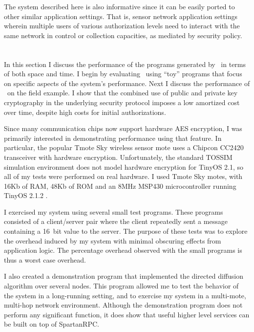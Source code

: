 The system described here is also informative since it can be easily ported to other similar
application settings. That is, sensor network application settings wherein multiple users of
various authorization levels need to interact with the same network in control or collection
capacities, as mediated by security policy.

\section{\Sprocket}
\label{section-sprocket-evaluation}

In this section I discuss the performance of the programs generated by \Sprocket\ in terms of
both space and time. I begin by evaluating \Sprocket\ using ``toy'' programs that focus on
specific aspects of the system's performance. Next I discuss the performance of \Sprocket\ on
the field example. I show that the combined use of public and private key cryptography in the
underlying security protocol imposes a low amortized cost over time, despite high costs for
initial authorizations.

Since many communication chips now support hardware AES encryption, I was primarily interested
in demonstrating performance using that feature. In particular, the popular Tmote Sky wireless
sensor mote \cite{tmotesky-datasheet} uses a Chipcon CC2420 transceiver with hardware
encryption. Unfortunately, the standard TOSSIM simulation environment does not model hardware
encryption for TinyOS 2.1, so all of my tests were performed on real hardware. I used Tmote Sky
motes, with 16Kb of RAM, 48Kb of ROM and an 8MHz MSP430 microcontroller running TinyOS 2.1.2
\cite{tinyos}.

I exercised my system using several small test programs. These programs consisted of a
client/server pair where the client repeatedly sent a message containing a 16~bit value to the
server. The purpose of these tests was to explore the overhead induced by my system with minimal
obscuring effects from application logic. The percentage overhead observed with the small
programs is thus a worst case overhead.

I also created a demonstration program that implemented the directed diffusion algorithm
\cite{intanagonwiwat-2003} over several nodes. This program allowed me to test the behavior of
the system in a long-running setting, and to exercise my system in a multi-mote, multi-hop
network environment. Although the demonstration program does not perform any significant
function, it does show that useful higher level services can be built on top of SpartanRPC.

